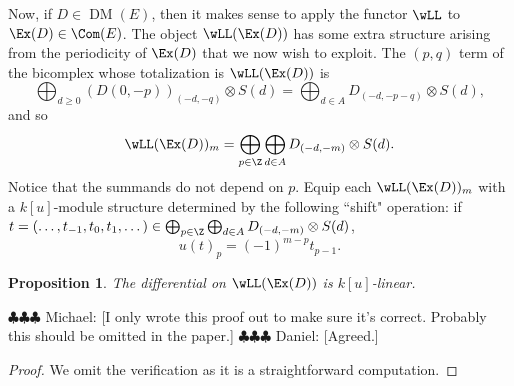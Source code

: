 \documentclass[12pt]{amsart}
\newtheorem{prop}[lemma]{Proposition}
\theoremstyle{definition}
\theoremstyle{remark}
\newcommand{\daniel}[1]{{\color{blue} \sf $\clubsuit\clubsuit\clubsuit$ Daniel: [#1]}}
\newcommand{\michael}[1]{{\color{red} \sf $\clubsuit\clubsuit\clubsuit$ Michael: [#1]}}
\def\on{\operatorname}
\def\DM{\operatorname{DM}}
\begin{document}
Now, if $D \in \DM(E)$, then it makes sense to apply the functor $\wLL$ to $\Ex(D) \in \Com(E)$. The object $\wLL(\Ex(D))$ has some extra structure arising from the periodicity of $\Ex(D)$ that we now wish to exploit. The $(p,q)$ term of the bicomplex whose totalization is $\wLL(\Ex(D))$ is 
$$
\bigoplus_{d \ge 0} (D(0, -p))_{(-d, -q)} \otimes S(d) = \bigoplus_{d \in A} D_{(-d, -p-q)} \otimes S(d),
$$
and so
$$
\wLL(\Ex(D))_m = \bigoplus_{p \in \Z}  \bigoplus_{d \in A} D_{(-d, -m)} \otimes S(d).
$$
Notice that the summands do not depend on $p$. Equip each $\wLL(\Ex(D))_m$ with a $k[u]$-module structure determined by the following ``shift" operation: if $t = (\dots, t_{-1}, t_0, t_1, \dots) \in \bigoplus_{p \in \Z}  \bigoplus_{d \in A} D_{(-d, -m)} \otimes S(d)$,
$$
u(t)_p = (-1)^{m - p} t_{p - 1}. 
$$

\begin{prop}
\label{ulinear}
The differential on $\wLL(\Ex(D))$ is $k[u]$-linear.
\end{prop}
\michael{I only wrote this proof out to make sure it's correct. Probably this should be omitted in the paper.}\daniel{Agreed.}
\begin{proof}
We omit the verification as it is a straightforward computation.
\iffalse
I'm writing down the proof to make sure I got the sign right in the definition of the $u$-action. We prove that the action of $u$ commutes with both horizontal and vertical differentials. Write $d_D$ for the differential on $D$ and $d_K$ for the dual Koszul differential. We have
\begin{align*}
d_{\on{hor}}(u \cdot (\dots, t_{-1}, t_0, t_1, \dots)) &= d_{\on{hor}}(\dots, (-1)^{m-1}t_{-2}, (-1)^{m} t_{-1}, (-1)^{m-1}t_0, \dots) \\
&= (\dots, (-1)^{m}d_T(t_{-3}), (-1)^{m-1} d_T(t_{-2}), (-1)^{m}d_T(t_{-1}), \dots) \\
&= u \cdot (\dots, d_T(t_{-2}),  d_T(t_{-1}), d_T(t_{0}), \dots) \\
& = u \cdot d_{\on{hor}} (\dots, t_{-1}, t_0, t_1, \dots),
\end{align*}
and 
\begin{align*}
d_{\on{ver}}(u \cdot (\dots, t_{-1}, t_0, t_1, \dots)) &= d_{\on{ver}}(\dots, (-1)^{m-1}t_{-2}, (-1)^{m} t_{-1}, (-1)^{m-1}t_0, \dots) \\
&= (\dots, (-1)^{m}d_K(t_{-2}), (-1)^{m} d_K(t_{-1}), (-1)^{m}d_K(t_{0}), \dots) \\
&= u \cdot (\dots, -d_K(t_{-1}),  d_K(t_{0}), -d_K(t_{1}), \dots) \\
& = u \cdot d_{\on{ver}} (\dots, t_{-1}, t_0, t_1, \dots).
\end{align*}
\fi
\end{proof}
\end{document}
